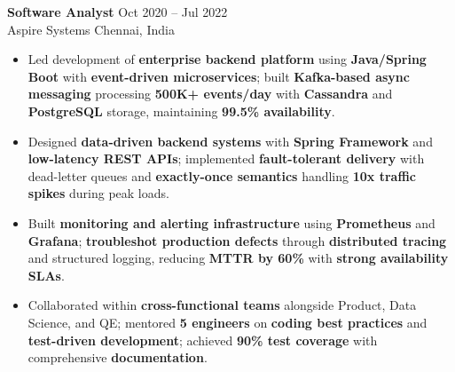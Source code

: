 \documentclass[letterpaper,10pt]{article}
\newcommand{\resumeItem}[1]{\item\small #1}
\newcommand{\resumeSubheading}[4]{
  \vspace{6pt}
  \noindent
  \textbf{#1} \hfill {\footnotesize #2} \\
  [-1pt]
  \noindent
  \small #3 \hfill {\small #4}
  \vspace{3pt}
}
\newcommand{\resumeItemsStart}{\vspace{-2pt}\begin{itemize}}
\newcommand{\resumeItemsEnd}{\end{itemize}\vspace{6pt}}
\begin{document}
\resumeSubheading
{Software Analyst}{Oct 2020 -- Jul 2022}
{Aspire Systems}{Chennai, India}
\resumeItemsStart
\resumeItem{Led development of \textbf{enterprise backend platform} using \textbf{Java/Spring Boot} with \textbf{event-driven microservices}; built \textbf{Kafka-based async messaging} processing \textbf{500K+ events/day} with \textbf{Cassandra} and \textbf{PostgreSQL} storage, maintaining \textbf{99.5\% availability}.}
\resumeItem{Designed \textbf{data-driven backend systems} with \textbf{Spring Framework} and \textbf{low-latency REST APIs}; implemented \textbf{fault-tolerant delivery} with dead-letter queues and \textbf{exactly-once semantics} handling \textbf{10x traffic spikes} during peak loads.}
\resumeItem{Built \textbf{monitoring and alerting infrastructure} using \textbf{Prometheus} and \textbf{Grafana}; \textbf{troubleshot production defects} through \textbf{distributed tracing} and structured logging, reducing \textbf{MTTR by 60\%} with \textbf{strong availability SLAs}.}
\resumeItem{Collaborated within \textbf{cross-functional teams} alongside Product, Data Science, and QE; mentored \textbf{5 engineers} on \textbf{coding best practices} and \textbf{test-driven development}; achieved \textbf{90\% test coverage} with comprehensive \textbf{documentation}.}
\resumeItemsEnd
\vspace{-8pt}


\end{document}
